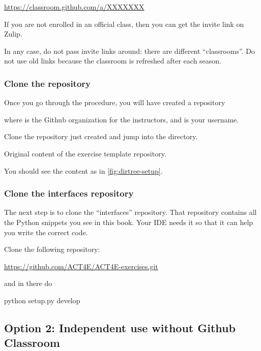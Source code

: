 \url{https://classroom.github.com/a/XXXXXXX}

If you are not enrolled in an official class, then you can get the invite link on Zulip.

In any case, do not pass invite links around: there are different ``classrooms''.
Do not use old links because the classroom is refreshed after each season.

\subsubsection{Clone the repository}

Once you go through the procedure, you will have created a repository

\begin{quote}
\end{quote}
where  is the Github organization for the instructors, and  is your username.

Clone the repository just created and jump into the directory.

\begin{marginfigure}
  \caption{Original content of the exercise template repository.}
  \label{fig:dirtree-setup}
\end{marginfigure}

You should see the content as in \cref{fig:dirtree-setup}.

\subsubsection{Clone the interfaces repository}

The next step is to clone the ``interfaces'' repository.
That repository contains all the Python snippets you see in this book.
Your IDE needs it so that it can help you write the correct code.

Clone the following repository:

\url{https://github.com/ACT4E/ACT4E-exercises.git}

and in there do

\begin{console}
  python setup.py develop
\end{console}

\subsection{Option 2: Independent use without Github Classroom}
\label{sub:without-classroom}


